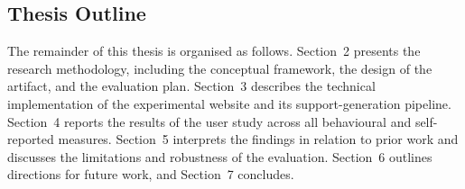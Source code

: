 \subsection{Thesis Outline}

The remainder of this thesis is organised as follows. Section~2 presents the research methodology, including the conceptual framework, the design of the artifact, and the evaluation plan. Section~3 describes the technical implementation of the experimental website and its support-generation pipeline. Section~4 reports the results of the user study across all behavioural and self-reported measures. Section~5 interprets the findings in relation to prior work and discusses the limitations and robustness of the evaluation. Section~6 outlines directions for future work, and Section~7 concludes.
